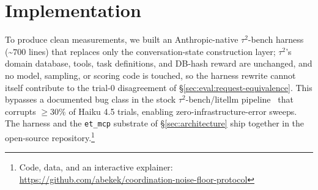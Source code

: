 \section{Implementation}
\label{sec:implementation}

To produce clean measurements, we built an Anthropic-native
$\tau^2$-bench harness (\textasciitilde$700$ lines) that replaces
only the conversation-state construction layer; $\tau^2$'s domain
database, tools, task definitions, and DB-hash reward are
unchanged, and no model, sampling, or scoring code is touched, so
the harness rewrite cannot itself contribute to the trial-$0$
disagreement of \S\ref{sec:eval:request-equivalence}. This bypasses a documented bug class in the stock
$\tau^2$-bench/litellm
pipeline~\cite{litellmissue12404,litellmissue15322} that corrupts
$\geq 30\%$ of Haiku 4.5 trials, enabling zero-infrastructure-error
sweeps. The harness and the \texttt{et\_mcp} substrate of
\S\ref{sec:architecture} ship together in the open-source
repository.\footnote{Code, data, and an interactive explainer:
\url{https://github.com/abekek/coordination-noise-floor-protocol}}

